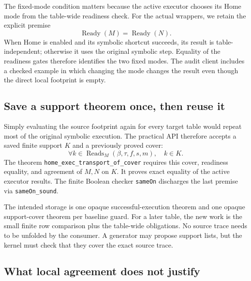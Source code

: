 \documentclass[11pt]{article}
\theoremstyle{definition}\newtheorem{definition}[theorem]{Definition}
\newcommand{\Reads}{\operatorname{Reads}}
\newcommand{\Ready}{\operatorname{Ready}}
\newcommand{\code}[1]{\texttt{#1}}
\begin{document}
The fixed-mode condition matters because the active executor chooses its Home
mode from the table-wide readiness check. For the actual wrappers, we retain
the explicit premise
\[
  \Ready(M)=\Ready(N).
\]
When Home is enabled and its symbolic shortcut succeeds, its result is
table-independent; otherwise it uses the original symbolic step. Equality of
the readiness gates therefore identifies the two fixed modes. The audit client
includes a checked example in which changing the mode changes the result even
though the direct local footprint is empty.

\subsection{Save a support theorem once, then reuse it}

Simply evaluating the source footprint again for every target table would
repeat most of the original symbolic execution. The practical API therefore
accepts a saved finite support \(K\) and a previously proved cover:
\[
   \forall k\in\Reads_M(\beta,\tau,f,s,m),\quad k\in K.
\]
The theorem \code{home\_exec\_transport\_of\_cover} requires this cover,
readiness equality, and agreement of \(M,N\) on \(K\). It proves exact equality
of the active executor results. The finite Boolean checker \code{sameOn}
discharges the last premise via \code{sameOn\_sound}.

The intended storage is one opaque successful-execution theorem and one opaque
support-cover theorem per baseline guard. For a later table, the new work is
the small finite row comparison plus the table-wide obligations. No source
trace needs to be unfolded by the consumer. A generator may propose support
lists, but the kernel must check that they cover the exact source trace.

\subsection{What local agreement does not justify}
\end{document}
